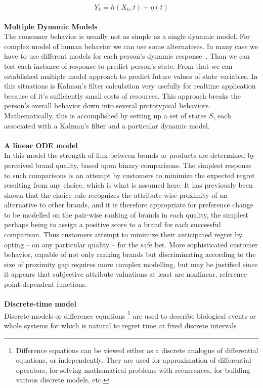 \begin{equation} \label{eq:2}
Y_k = h(X_k, t) + \eta(t)
\end{equation}
\\
\textbf{Multiple Dynamic Models} \label{subsec:multipleDynamicModels}\\
The consumer behavior is usually not as simple as a single dynamic model.
For complex model of human behavior we can use some alternatives.
In many case we have to use different models for each person's dynamic response~\cite{wilsky}.
Than we can test each instance of response to predict person's state.
From that we can established multiple model approach to predict future values of state variables.
In this situations is Kalman's filter calculation very usefully for realtime application because of it's sufficiently small costs of resources.
This approach breaks the person's overall behavior down into several prototypical behaviors.~\cite{pantland}
Mathematically, this is accomplished by setting up a set of states $S$, each associated with a Kalman's filter and a particular dynamic model.\\
\\
\textbf{A linear ODE model} \label{subsec:ode}\\
In this model the strength of flux between brands or products are determined by perceived brand quality,
based upon binary comparisons.
The simplest response to such comparisons is an attempt by customers to minimize the expected regret resulting
from any choice, which is what is assumed here.
It has previously been shown that the choice rule recognizes the attribute-wise proximity of an alternative
to other brands, and it is therefore appropriate for preference change to be modelled on the pair-wise ranking
of brands in each quality, the simplest perhaps being to assign a positive score to a brand for each successful comparison.
Thus customers attempt to minimize their anticipated regret by opting – on any particular quality – for the safe bet.
More sophisticated customer behavior, capable of not only ranking brands but discriminating according to the size of proximity gap
requires more complex modelling, but may be justified since it appears that subjective attribute valuations at least are nonlinear, reference-point-dependent functions.\\
\\
\textbf{Discrete-time model} \label{subsec:discrete}\\
Discrete models or difference equations \footnote{Difference equations can be viewed either as a discrete analogue of differential equations, or independently.
They are used for approximation of differential operators, for solving mathematical problems with recurrences, for building various discrete
models, etc.} are used to describe biological events or whole systems for which is natural to regret time at fixed discrete intervals~\cite{pantland}.

